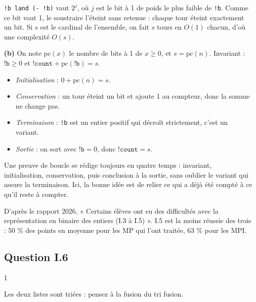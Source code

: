 \documentclass[11pt,a4paper]{article}
\providecommand{\tightlist}{\setlength{\itemsep}{0pt}\setlength{\parskip}{0pt}}
\renewcommand{\geq}{\geqslant}
\begin{document}
\texttt{!b\ land\ (-\ !b)} vaut \(2^j\), où \(j\) est le bit à 1 de poids le plus faible de \texttt{!b}. Comme ce bit vaut 1, le soustraire l'éteint sans retenue : chaque tour éteint exactement un bit. Si \(s\) est le cardinal de l'ensemble, on fait \(s\) tours en \(O(1)\) chacun, d'où une complexité \(\boxed{O(s)}\).

\textbf{(b)} On note \(\mathrm{pc}(x)\) le nombre de bits à 1 de \(x\geq0\), et \(s=\mathrm{pc}(n)\). Invariant : \(\texttt{!b}\geq0\) et \(\texttt{!count}+\mathrm{pc}(\texttt{!b})=s\).

\begin{itemize}
\tightlist
\item
  \emph{Initialisation} : \(0+\mathrm{pc}(n)=s\).
\item
  \emph{Conservation} : un tour éteint un bit et ajoute 1 au compteur, donc la somme ne change pas.
\item
  \emph{Terminaison} : \texttt{!b} est un entier positif qui décroît strictement, c'est un variant.
\item
  \emph{Sortie} : on sort avec \(\texttt{!b}=0\), donc \(\texttt{!count}=s\).
\end{itemize}

\begin{methode}

Une preuve de boucle se rédige toujours en quatre temps : invariant, initialisation, conservation, puis conclusion à la sortie, sans oublier le variant qui assure la terminaison. Ici, la bonne idée est de relier ce qui a déjà été compté à ce qu'il reste à compter.

\end{methode}

\begin{jury}

D'après le rapport 2026, « Certains élèves ont eu des difficultés avec la représentation en binaire des entiers (I.3 à I.5) ». I.5 est la moins réussie des trois : 50 \% des points en moyenne pour les MP qui l'ont traitée, 63 \% pour les MPI.

\end{jury}

\hypertarget{question-i.6}{%
\subsection{Question I.6}\label{question-i.6}}

\begin{indication}{1}

Les deux listes sont triées : pensez à la fusion du tri fusion.

\end{indication}
\end{document}
